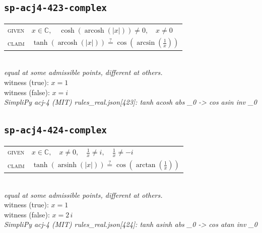 \documentclass[11pt]{article}
\begin{document}
\subsection*{\texttt{sp-acj4-423-complex}}
\begin{tabular}{@{}l@{\quad}l@{}}
\textsc{given} & $x \in \mathbb{C},\quad \cosh\left(\operatorname{arcosh}\left(\left|x\right|\right)\right) \neq 0,\quad x \neq 0$ \\[4pt]
\textsc{claim} & $\displaystyle \tanh\left(\operatorname{arcosh}\left(\left|x\right|\right)\right) \overset{?}{=} \cos\left(\arcsin\left(\frac{1}{x}\right)\right)$ \\
\end{tabular}\\[2pt]
{\small\emph{equal at some admissible points, different at others.}}\\
{\footnotesize\color{gray}witness (true): $x = 1$}\\
{\footnotesize\color{gray}witness (false): $x = i$}\\
\emph{SimpliPy acj-4 (MIT) rules\_real.json[423]: tanh acosh abs \_0  ->  cos asin inv \_0}\\

\subsection*{\texttt{sp-acj4-424-complex}}
\begin{tabular}{@{}l@{\quad}l@{}}
\textsc{given} & $x \in \mathbb{C},\quad x \neq 0,\quad \frac{1}{x} \neq i,\quad \frac{1}{x} \neq -i$ \\[4pt]
\textsc{claim} & $\displaystyle \tanh\left(\operatorname{arsinh}\left(\left|x\right|\right)\right) \overset{?}{=} \cos\left(\arctan\left(\frac{1}{x}\right)\right)$ \\
\end{tabular}\\[2pt]
{\small\emph{equal at some admissible points, different at others.}}\\
{\footnotesize\color{gray}witness (true): $x = 1$}\\
{\footnotesize\color{gray}witness (false): $x = 2 \, i$}\\
\emph{SimpliPy acj-4 (MIT) rules\_real.json[424]: tanh asinh abs \_0  ->  cos atan inv \_0}\\
\end{document}
